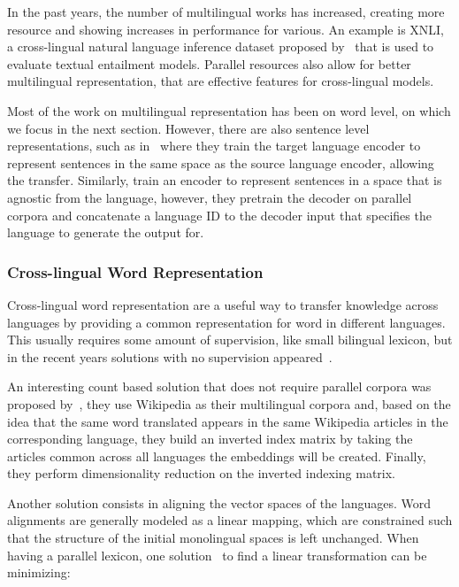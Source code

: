 In the past years, the number of multilingual works has increased, creating more resource and showing increases in performance for various. An example is XNLI, a cross-lingual natural language inference dataset proposed by~\cite{conneau2018xnli} that is used to evaluate textual entailment models. Parallel resources also allow for better multilingual representation, that are effective features for cross-lingual models.

\newpage

Most of the work on multilingual representation has been on word level, on which we focus in the next section. However, there are also sentence level representations, such as in~\citep{conneau2018xnli} where they train the target language encoder to represent sentences in the same space as the source language encoder, allowing the transfer. Similarly, \cite{atetxe2018massively} train an encoder to represent sentences in a space that is agnostic from the language, however, they pretrain the decoder on parallel corpora and concatenate a language ID to the decoder input that specifies the language to generate the output for.

\subsubsection{Cross-lingual Word Representation}

Cross-lingual word representation are a useful way to transfer knowledge across languages by providing a common representation for word in different languages. This usually requires some amount of supervision, like small bilingual lexicon, but in the recent years solutions with no supervision appeared~\citep{lample2018translation}.

An interesting count based solution that does not require parallel corpora was proposed by~\cite{sogaard2015inverted}, they use Wikipedia as their multilingual corpora and, based on the idea that the same word translated appears in the same Wikipedia articles in the corresponding language, they build an inverted index matrix by taking the articles common across all languages the embeddings will be created. Finally, they perform dimensionality reduction on the inverted indexing matrix.

Another solution consists in aligning the vector spaces of the languages. Word alignments are generally modeled as a linear mapping, which are constrained such that the structure of the initial monolingual spaces is left unchanged. When having a parallel lexicon, one solution~\citep{mikolov2013exploiting} to find a linear transformation can be minimizing:

